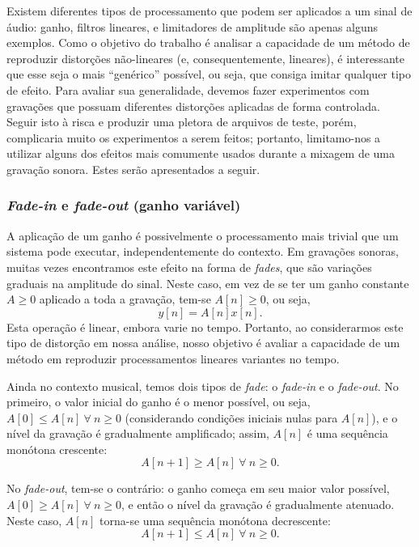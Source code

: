 Existem diferentes tipos de processamento que podem ser aplicados a um sinal de áudio: ganho, filtros lineares, e limitadores de amplitude são apenas alguns exemplos. Como o objetivo do trabalho é analisar a capacidade de um método de reproduzir distorções não-lineares (e, consequentemente, lineares), é interessante que esse seja o mais ``genérico'' possível, ou seja, que consiga imitar qualquer tipo de efeito. Para avaliar sua generalidade, devemos fazer experimentos com gravações que possuam diferentes distorções aplicadas de forma controlada. Seguir isto à risca e produzir uma pletora de arquivos de teste, porém, complicaria muito os experimentos a serem feitos; portanto, limitamo-nos a utilizar alguns dos efeitos mais comumente usados durante a mixagem de uma gravação sonora. Estes serão apresentados a seguir.

\subsubsection{\textit{Fade-in} e \textit{fade-out} (ganho variável)}

A aplicação de um ganho é possivelmente o processamento mais trivial que um sistema pode executar, independentemente do contexto. Em gravações sonoras, muitas vezes encontramos este efeito na forma de \textit{fades}, que são variações graduais na amplitude do sinal. Neste caso, em vez de se ter um ganho constante $A \geq 0$ aplicado a toda a gravação, tem-se $A[n] \geq 0$, ou seja,
\begin{equation}
    y[n] = A[n] x[n].
\end{equation}
Esta operação é linear, embora varie no tempo. Portanto, ao considerarmos este tipo de distorção em nossa análise, nosso objetivo é avaliar a capacidade de um método em reproduzir processamentos lineares variantes no tempo.

Ainda no contexto musical, temos dois tipos de \textit{fade}: o \textit{fade-in} e o \textit{fade-out}. No primeiro, o valor inicial do ganho é o menor possível, ou seja, $A[0] \leq A[n]\ \forall\ n \geq 0$ (considerando condições iniciais nulas para $A[n]$), e o nível da gravação é gradualmente amplificado; assim, $A[n]$ é uma sequência monótona crescente:
\begin{equation}
    A[n + 1] \geq A[n]\ \forall\ n \geq 0.
    \label{eq:intro-fade-in}
\end{equation}

No \textit{fade-out}, tem-se o contrário: o ganho começa em seu maior valor possível, $A[0] \geq A[n]\ \forall\ n \geq 0$, e então o nível da gravação é gradualmente atenuado. Neste caso, $A[n]$ torna-se uma sequência monótona decrescente:
\begin{equation}
    A[n + 1] \leq A[n]\ \forall\ n \geq 0.
    \label{eq:intro-fade-out}
\end{equation}

